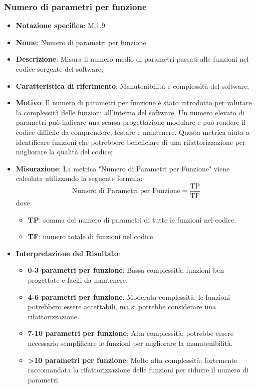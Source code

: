 \subsubsection{Numero di parametri per funzione}
\begin{itemize}
    \item \textbf{Notazione specifica}: M.1.9
    \item \textbf{Nome}: Numero di parametri per funzione
    \item \textbf{Descrizione}: Misura il numero medio di parametri passati alle funzioni nel codice sorgente del software;
    \item \textbf{Caratteristica di riferimento}: Manutenibilità e complessità del software;
    \item \textbf{Motivo}: Il numero di parametri per funzione è stato introdotto per valutare la complessità delle funzioni all'interno del software. Un numero elevato di parametri può indicare una scarsa progettazione modulare e può rendere il codice difficile da comprendere, testare e mantenere. Questa metrica aiuta a identificare funzioni che potrebbero beneficiare di una rifattorizzazione per migliorare la qualità del codice;
    \item \textbf{Misurazione}: La metrica "Numero di Parametri per Funzione" viene calcolata utilizzando la seguente formula:
    \[
    \text{Numero di Parametri per Funzione} = \frac{\text{TP}}{\text{TF}}
    \]
    dove:
    \begin{itemize}
        \item \textbf{TP}: somma del numero di parametri di tutte le funzioni nel codice.
        \item \textbf{TF}: numero totale di funzioni nel codice.
    \end{itemize}
    \item \textbf{Interpretazione del Risultato}:
    \begin{itemize}
        \item \textbf{0-3 parametri per funzione}: Bassa complessità; funzioni ben progettate e facili da mantenere.
        \item \textbf{4-6 parametri per funzione}: Moderata complessità; le funzioni potrebbero essere accettabili, ma si potrebbe considerare una rifattorizzazione.
        \item \textbf{7-10 parametri per funzione}: Alta complessità; potrebbe essere necessario semplificare le funzioni per migliorare la manutenibilità.
        \item \textbf{>10 parametri per funzione}: Molto alta complessità; fortemente raccomandata la rifattorizzazione delle funzioni per ridurre il numero di parametri.
    \end{itemize}
\end{itemize}
